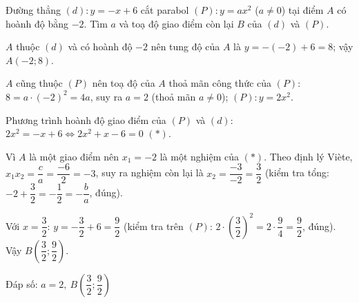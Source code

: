 \begin{problem}[9DS-HSB2-024]
Đường thẳng $(d)\colon y = -x + 6$ cắt parabol $(P)\colon y = ax^2$ ($a \neq 0$) tại điểm $A$ có hoành độ bằng $-2$. Tìm $a$ và toạ độ giao điểm còn lại $B$ của $(d)$ và $(P)$.

\begin{solution}
$A$ thuộc $(d)$ và có hoành độ $-2$ nên tung độ của $A$ là $y = -(-2) + 6 = 8$; vậy $A(-2; 8)$.

$A$ cũng thuộc $(P)$ nên toạ độ của $A$ thoả mãn công thức của $(P)$: $8 = a \cdot (-2)^2 = 4a$, suy ra $a = 2$ (thoả mãn $a \neq 0$); $(P)\colon y = 2x^2$.

Phương trình hoành độ giao điểm của $(P)$ và $(d)$: $2x^2 = -x + 6 \Leftrightarrow 2x^2 + x - 6 = 0$ $(*)$.

Vì $A$ là một giao điểm nên $x_1 = -2$ là một nghiệm của $(*)$. Theo định lý Viète, $x_1 x_2 = \dfrac{c}{a} = \dfrac{-6}{2} = -3$, suy ra nghiệm còn lại là $x_2 = \dfrac{-3}{-2} = \dfrac{3}{2}$ (kiểm tra tổng: $-2 + \dfrac{3}{2} = -\dfrac{1}{2} = -\dfrac{b}{a}$, đúng).

Với $x = \dfrac{3}{2}$: $y = -\dfrac{3}{2} + 6 = \dfrac{9}{2}$ (kiểm tra trên $(P)$: $2 \cdot \left(\dfrac{3}{2}\right)^2 = 2 \cdot \dfrac{9}{4} = \dfrac{9}{2}$, đúng). Vậy $B\left(\dfrac{3}{2}; \dfrac{9}{2}\right)$.

Đáp số: $\boxed{a = 2,\ B\left(\dfrac{3}{2}; \dfrac{9}{2}\right)}$
\end{solution}
\end{problem}

